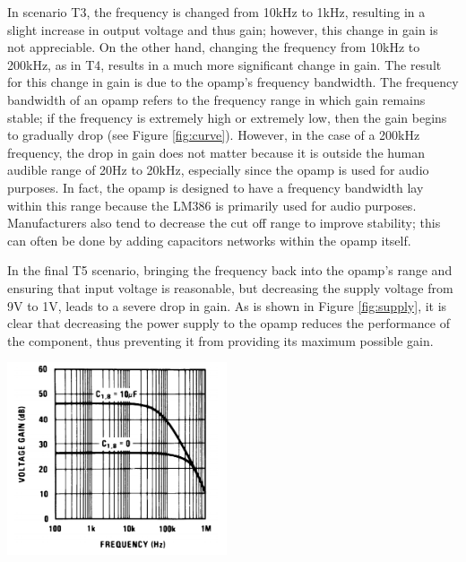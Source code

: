 \documentclass[journal]{IEEEtran}
\begin{document}
\noindent In scenario T3, the frequency is changed from 10kHz to 1kHz, resulting in a slight increase in output voltage and thus gain; however, this change in gain is not appreciable. On the other hand, changing the frequency from 10kHz to 200kHz, as in T4, results in a much more significant change in gain. The result for this change in gain is due to the opamp's frequency bandwidth. The frequency bandwidth of an opamp refers to the frequency range in which gain remains stable; if the frequency is extremely high or extremely low, then the gain begins to gradually drop (see Figure \ref{fig:curve}). However, in the case of a 200kHz frequency, the drop in gain does not matter because it is outside the human audible range of 20Hz to 20kHz, especially since the opamp is used for audio purposes. In fact, the opamp is designed to have a frequency bandwidth lay within this range because the LM386 is primarily used for audio purposes. Manufacturers also tend to decrease the cut off range to improve stability; this can often be done by adding capacitors networks within the opamp itself.

\noindent In the final T5 scenario, bringing the frequency back into the opamp's range and ensuring that input voltage is reasonable, but decreasing the supply voltage from 9V to 1V, leads to a severe drop in gain. As is shown in Figure \ref{fig:supply}, it is clear that decreasing the power supply to the opamp reduces the performance of the component, thus preventing it from providing its maximum possible gain. 

\begingroup
\medskip
    \centering
    \includegraphics[width=245]{images/lab6_5.png}
    \label{fig:curve}
    \medskip
\endgroup
\end{document}

